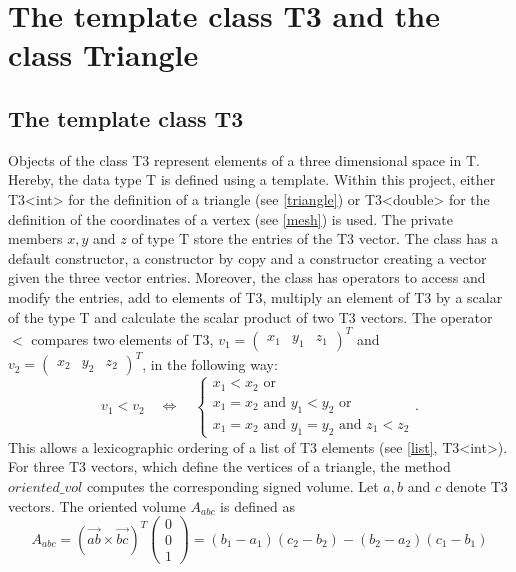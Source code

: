 \documentclass[10pt]{article}
\begin{document}
\section{The template class T3 and the class Triangle}

\subsection{The template class T3} \label{T3}

Objects of the class {\ttfamily T3} represent elements of a three dimensional space in {\ttfamily T}. Hereby, the data type {\ttfamily T} is defined using a template. Within this project, either {\ttfamily T3<int>} for the definition of a triangle (see \ref{triangle}) or {\ttfamily T3<double>} for the definition of the coordinates of a vertex (see \ref{mesh}) is used. The private members $x,y$ and $z$ of type {\ttfamily T} store the entries of the {\ttfamily T3} vector. The class has a default constructor, a constructor by copy and a constructor creating a vector given the three vector entries. Moreover, the class has operators to access and modify the entries, add to elements of {\ttfamily T3}, multiply an element of {\ttfamily T3} by a scalar of the type T and calculate the scalar product of two {\ttfamily T3} vectors. The operator $<$ compares two elements of {\ttfamily T3}, $v_1 = \begin{pmatrix} x_1 & y_1 & z_1 \end{pmatrix}^T$ and $v_2 = \begin{pmatrix} x_2 & y_2 & z_2 \end{pmatrix}^T$, in the following way:
$$ v_1 < v_2 \quad \Leftrightarrow \quad \begin{cases}
 x_1 < x_2 \text{ or }\\
 x_1 = x_2 \text{ and } y_1 < y_2 \text{ or }\\
 x_1 = x_2 \text{ and } y_1 = y_2 \text{ and } z_1 < z_2
\end{cases}. $$ 
This allows a lexicographic ordering of a list of {\ttfamily T3} elements (see \ref{list}, {\ttfamily T3<int>}). For three {\ttfamily T3} vectors, which define the vertices of a triangle, the method $ oriented\_vol $ computes the corresponding signed volume. Let $a,b$ and $c$ denote {\ttfamily T3} vectors. The oriented volume $A_{abc}$ is defined as
$$ A_{abc} = \left( \overrightarrow{ab} \times \overrightarrow{bc} \right)^T \begin{pmatrix} 0 \\ 0 \\ 1 \end{pmatrix} = (b_1-a_1)(c_2-b_2) - (b_2-a_2)(c_1-b_1)$$
\end{document}
